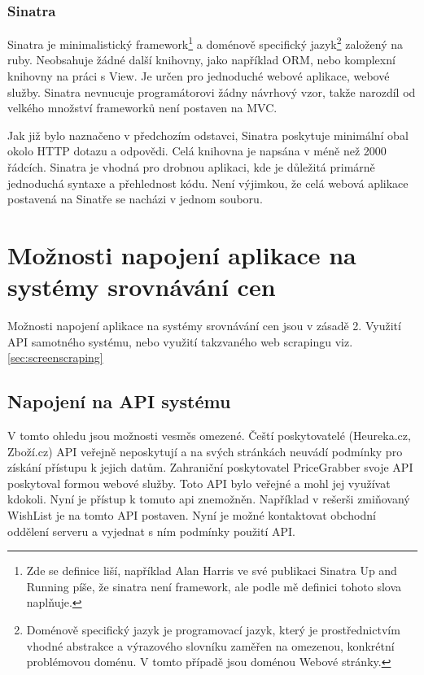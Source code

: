 \subsubsection{Sinatra}
Sinatra je minimalistický framework\footnote{Zde se definice liší, například Alan Harris ve své publikaci Sinatra Up and Running píše, že sinatra není framework, ale podle mě definici tohoto slova naplňuje.} a doménově specifický jazyk\footnote{Doménově specifický jazyk je programovací jazyk, který je prostřednictvím vhodné abstrakce a výrazového slovníku zaměřen na omezenou, konkrétní problémovou doménu. V tomto případě jsou doménou Webové stránky.} založený na ruby. Neobsahuje žádné další knihovny, jako například ORM, nebo komplexní knihovny na práci s View. Je určen pro jednoduché webové aplikace, webové služby. Sinatra nevnucuje programátorovi žádny návrhový vzor, takže narozdíl od velkého množství frameworků není postaven na MVC.\cite{harris2011sinatra}

Jak již bylo naznačeno v předchozím odstavci, Sinatra poskytuje minimální obal okolo HTTP dotazu a odpovědi. Celá knihovna je napsána v méně než 2000 řádcích\cite{harris2011sinatra}. Sinatra je vhodná pro drobnou aplikaci, kde je důležitá primárně jednoduchá syntaxe a přehlednost kódu. Není výjimkou, že celá webová aplikace postavená na Sinatře se nacházi v jednom souboru\cite{harris2011sinatra}.

\section{Možnosti napojení aplikace na systémy srovnávání cen}
Možnosti napojení aplikace na systémy srovnávání cen jsou v zásadě 2. Využití API samotného systému, nebo využití takzvaného web scrapingu viz. \ref{sec:screenscraping}

\subsection{Napojení na API systému}
V tomto ohledu jsou možnosti vesměs omezené. Čeští poskytovatelé (Heureka.cz, Zboží.cz) API veřejně neposkytují a na svých stránkách neuvádí podmínky pro získání přístupu k jejich datům. Zahraniční poskytovatel PriceGrabber svoje API poskytoval formou webové služby. Toto API bylo veřejné a mohl jej využívat kdokoli. Nyní je přístup k tomuto api znemožněn\cite{website:pricegrabber-api}. Například v rešerši zmiňovaný WishList je na tomto API postaven. Nyní je možné kontaktovat obchodní oddělení serveru a vyjednat s ním podmínky použití API.

